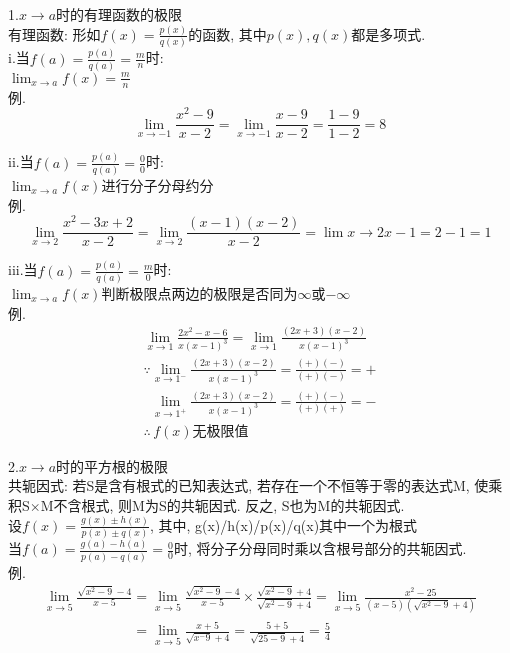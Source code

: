 \documentclass[UTF8, fontset=ubuntu]{ctexart}
\begin{document}
1.$x\to a$时的有理函数的极限\\
有理函数: 形如$f(x)=\frac{p(x)}{q(x)}$的函数, 其中$p(x),q(x)$都是多项式.\\
i.当$f(a)=\frac{p(a)}{q(a)}=\frac{m}{n}$时:\\
$\displaystyle\lim_{x\to a}f(x)=\frac{m}{n}$\\
例.
\[\lim_{x\to -1}\frac{x^2-9}{x-2}=\lim_{x\to -1}\frac{x-9}{x-2}=\frac{1-9}{1-2}=8\]

ii.当$f(a)=\frac{p(a)}{q(a)}=\frac{0}{0}$时:\\
$\displaystyle\lim_{x\to a}f(x)$进行分子分母约分\\
例.
\[\lim_{x\to 2}\frac{x^2-3x+2}{x-2}=\lim_{x\to 2}\frac{(x-1)(x-2)}{x-2}=\lim{x\to 2}x-1=2-1=1\]

iii.当$f(a)=\frac{p(a)}{q(a)}=\frac{m}{0}$时:\\
$\displaystyle\lim_{x\to a}f(x)$判断极限点两边的极限是否同为$\infty$或$-\infty$\\
例.
\begin{displaymath}
\begin{array}{l}
    \displaystyle\lim_{x\to 1}\frac{2x^2-x-6}{x(x-1)^3}=\lim_{x\to 1}\frac{(2x+3)(x-2)}{x(x-1)^3}\\
	\displaystyle\mathbf{\because}\lim_{x\to 1^-}\frac{(2x+3)(x-2)}{x(x-1)^3}=\frac{(+)(-)}{(+)(-)}=+\\
    \displaystyle\phantom{\because}\lim_{x\to 1^+}\frac{(2x+3)(x-2)}{x(x-1)^3}=\frac{(+)(-)}{(+)(+)}=-\\
	\displaystyle\mathbf{\therefore}\,f(x)\text{无极限值}
\end{array}
\end{displaymath}\vspace{2ex}

2.$x\to a$时的平方根的极限\\
共轭因式: 若S是含有根式的已知表达式, 若存在一个不恒等于零的表达式M, 使乘积S$\times$M不含根式, 则M为S的共轭因式. 反之, S也为M的共轭因式.\\
设$f(x)=\frac{g(x)\pm h(x)}{p(x)\pm q(x)}$, 其中, g(x)/h(x)/p(x)/q(x)其中一个为根式\\
当$f(a)=\frac{g(a)-h(a)}{p(a)-q(a)}=\frac{0}{0}$时, 将分子分母同时乘以含根号部分的共轭因式.\\
例.
\begin{displaymath}
\begin{array}{l}
    \displaystyle\lim_{x\to 5}\frac{\sqrt{x^2-9}-4}{x-5}=\lim_{x\to 5}\frac{\sqrt{x^2-9}-4}{x-5}\times\frac{\sqrt{x^2-9}+4}{\sqrt{x^2-9}+4}=\lim_{x\to 5}\frac{x^2-25}{(x-5)(\sqrt{x^2-9}+4)}\\
    \displaystyle\phantom{\lim_{x\to 5}\frac{\sqrt{x^2-9}-4}{x-5}}=\lim_{x\to 5}\frac{x+5}{\sqrt{x^-9}+4}=\frac{5+5}{\sqrt{25-9}+4}=\frac{5}{4}
\end{array}
\end{displaymath}\vspace{2ex}
\end{document}
